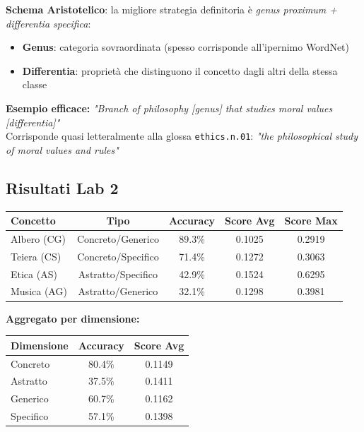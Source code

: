 \documentclass[12pt,a4paper]{article}
\begin{document}
\begin{defbox}
\textbf{Schema Aristotelico}: la migliore strategia definitoria \`e \emph{genus proximum + differentia specifica}:
\begin{itemize}
  \item \textbf{Genus}: categoria sovraordinata (spesso corrisponde all'ipernimo WordNet)
  \item \textbf{Differentia}: propriet\`a che distinguono il concetto dagli altri della stessa classe
\end{itemize}
\textbf{Esempio efficace:} \textit{"Branch of philosophy [genus] that studies moral values [differentia]"}\\
Corrisponde quasi letteralmente alla glossa \texttt{ethics.n.01}: \textit{"the philosophical study of moral values and rules"}
\end{defbox}

\subsection{Risultati Lab 2}

\begin{resultbox}
\begin{center}
\begin{tabular}{lcccc}
\toprule
\textbf{Concetto} & \textbf{Tipo} & \textbf{Accuracy} & \textbf{Score Avg} & \textbf{Score Max} \\
\midrule
Albero (CG)  & Concreto/Generico  & 89.3\% & 0.1025 & 0.2919 \\
Teiera (CS)  & Concreto/Specifico & 71.4\% & 0.1272 & 0.3063 \\
Etica (AS)   & Astratto/Specifico & 42.9\% & 0.1524 & 0.6295 \\
Musica (AG)  & Astratto/Generico  & 32.1\% & 0.1298 & 0.3981 \\
\bottomrule
\end{tabular}
\end{center}

\bigskip
\textbf{Aggregato per dimensione:}
\begin{center}
\begin{tabular}{lcc}
\toprule
\textbf{Dimensione} & \textbf{Accuracy} & \textbf{Score Avg} \\
\midrule
Concreto & 80.4\% & 0.1149 \\
Astratto & 37.5\% & 0.1411 \\
Generico & 60.7\% & 0.1162 \\
Specifico & 57.1\% & 0.1398 \\
\bottomrule
\end{tabular}
\end{center}
\end{resultbox}
\end{document}
